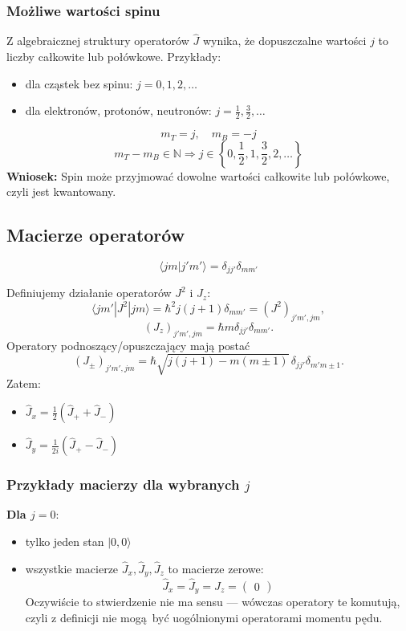 \subsubsection*{Możliwe wartości spinu}
Z algebraicznej struktury operatorów $\hat{J}$ wynika, że dopuszczalne wartości $j$ to liczby całkowite lub połówkowe. Przykłady:
\begin{itemize}
\item dla cząstek bez spinu: $j = 0, 1, 2, \dots$
\item dla elektronów, protonów, neutronów: $j = \tfrac{1}{2}, \tfrac{3}{2}, \dots$
\end{itemize}
$$
m_T = j, \quad m_B = -j
$$
$$
m_T - m_B \in \mathbb{N} \Rightarrow j \in \left\{0, \frac{1}{2}, 1, \frac{3}{2}, 2, \dots \right\}
$$
\textbf{Wniosek:} Spin może przyjmować dowolne wartości całkowite lub połówkowe, czyli jest kwantowany.

\subsection{Macierze operatorów}
$$
\langle j m | j' m' \rangle = \delta_{jj'} \delta_{mm'}
$$

Definiujemy działanie operatorów $J^2$ i $J_z$:
$$
\langle j m' | J^2 | j m \rangle = \hbar^2 j(j+1) \delta_{mm'} = (J^2)_{j'm', jm},
$$
$$
(J_z)_{j'm', jm} = \hbar m \delta_{jj'} \delta_{mm'}.
$$
Operatory podnoszący/opuszczający mają postać
$$
(J_\pm)_{j'm', jm} = \hbar \sqrt{j(j+1) - m(m \pm 1)} \, \delta_{jj'} \delta_{m'm\pm 1}.
$$
Zatem:
\begin{itemize}
\item $\hat{J}_x = \frac{1}{2}(\hat{J}_+ + \hat{J}_-)$
\item $\hat{J}_y = \frac{1}{2i}(\hat{J}_+ - \hat{J}_-)$
\end{itemize}

\subsubsection*{Przykłady macierzy dla wybranych $j$}
\textbf{Dla $j = 0$}:
\begin{itemize}
\item tylko jeden stan $|0, 0\rangle$
\item wszystkie macierze $\hat{J}_x, \hat{J}_y, \hat{J}_z$ to macierze zerowe:
  $$
  \hat{J}_x = \hat{J}_y = \hat{J}_z = \begin{pmatrix} 0 \end{pmatrix}
  $$
  Oczywiście to stwierdzenie nie ma sensu --- wówczas operatory te komutują,
  czyli z definicji nie mogą być uogólnionymi operatorami momentu pędu.
\end{itemize}

